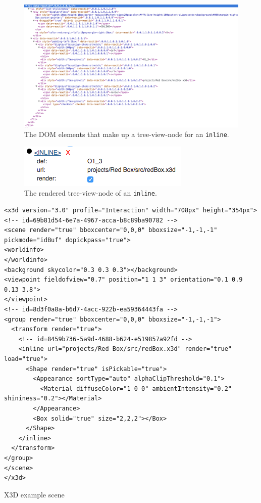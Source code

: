 \begin{figure}
  \centering
  \includegraphics[width=\textwidth]{../assets/treeview-node-dom.png}
  \caption{The DOM elements that make up a tree-view-node for an \texttt{inline}.}
  \label{fig:tree-view-node-dom}
\end{figure}

\begin{figure}
  \centering
  \includegraphics[width=.5\textwidth]{../assets/tree-view-node-rendered.png}
  \caption{The rendered tree-view-node of an \texttt{inline}.}
  \label{fig:tree-view-node-rendered}
\end{figure}

\begin{listing}
  \begin{verbatim}
<x3d version="3.0" profile="Interaction" width="708px" height="354px">
<!-- id=69b81d54-6e7a-4967-acca-b8c89ba90782 -->
<scene render="true" bboxcenter="0,0,0" bboxsize="-1,-1,-1" pickmode="idBuf" dopickpass="true">
<worldinfo>
</worldinfo>
<background skycolor="0.3 0.3 0.3"></background>
<viewpoint fieldofview="0.7" position="1 1 3" orientation="0.1 0.9 0.13 3.8">
</viewpoint>
<!-- id=8d3f0a8a-b6d7-4acc-922b-ea59364443fa -->
<group render="true" bboxcenter="0,0,0" bboxsize="-1,-1,-1">
  <transform render="true">
    <!-- id=8459b736-5a9d-4688-b624-e519857a92fd -->
    <inline url="projects/Red Box/src/redBox.x3d" render="true" load="true">
      <Shape render="true" isPickable="true">
        <Appearance sortType="auto" alphaClipThreshold="0.1">
          <Material diffuseColor="1 0 0" ambientIntensity="0.2" shininess="0.2"></Material>
        </Appearance>
        <Box solid="true" size="2,2,2"></Box>
      </Shape>
    </inline>
  </transform>
</group>
</scene>
</x3d>
  \end{verbatim}
	\caption{X3D example scene}
	\label{list:x3dscene}
\end{listing}

